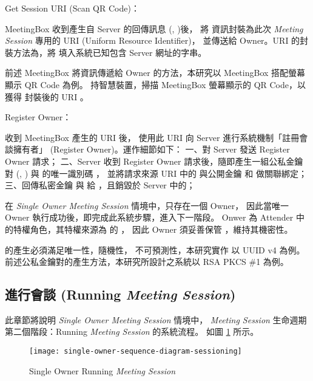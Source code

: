 \begin{steps}
    \item Get Session URI (Scan QR Code)：

            MeetingBox 收到產生自 Server 的回傳訊息 (\DEFsessionID, \DEFunsealKey)後，
        將 \DEFsessionID 資訊封裝為此次 {\it Meeting Session} 專用的 URI (Uniform Resource Identifier)，
        並傳送給 Owner。URI 的封裝方法為，將 \DEFsessionID 填入系統已知包含 Server 網址的字串。

            前述 MeetingBox 將資訊傳遞給 Owner 的方法，本研究以 MeetingBox 搭配螢幕顯示 QR Code 為例。
        \DEFowner 持智慧裝置，掃描 MeetingBox 螢幕顯示的 QR Code，以獲得 \DEFsessionID 封裝後的 URI 。

    \item Register Owner：

            \DEFowner 收到 MeetingBox 產生的 URI 後，
        使用此 URI 向 Server 進行系統機制「註冊會談擁有者」 (Register Owner)。運作細節如下：
        一、\DEFowner 對 Server 發送 Register Owner 請求；
        二、Server 收到 Register Owner 請求後，隨即產生一組公私金鑰對 (\DEFpublicKey, \DEFprivateKey)
        與 \DEFowner 的唯一識別碼 \DEFownerID，
        並將請求來源 URI 中的 \DEFsessionID 與公開金鑰 \DEFpublicKey 和 \DEFownerID 做關聯綁定；
        三、回傳私密金鑰 \DEFprivateKey 與 \DEFownerID 給 \DEFowner，且銷毀於 Server 中的\DEFprivateKey；

            在 {\it Single Owner Meeting Session} 情境中，只存在一個 Owner，
        因此當唯一 Owner 執行成功後，即完成此系統步驟，進入下一階段。
        Onwer 為 Attender 中的特權角色，其特權來源為 \DEFowner 的 \DEFprivateKey，
        因此 Owner 須妥善保管 \DEFprivateKey，維持其機密性。

            \DEFownerID 的產生必須滿足唯一性，隨機性，
        不可預測性，本研究實作 \DEFownerID 以 UUID v4 為例。
        前述公私金鑰對的產生方法，本研究所設計之系統以 RSA PKCS \#1 為例。
\end{steps}

\subsection{進行會談 (Running {\it Meeting Session})}
\label{subsec.sessioning}

    此章節將說明 {\it Single Owner Meeting Session} 情境中，
{\it Meeting Session} 生命週期第二個階段：Running {\it Meeting Session} 的系統流程。
如圖 \ref{fig.s-o-sessioning} 所示。

\begin{figure}[H]
    \centering
    \texttt{[image: single-owner-sequence-diagram-sessioning]}
    \caption{Single Owner Running {\it Meeting Session}}
    \label{fig.s-o-sessioning}
\end{figure}

